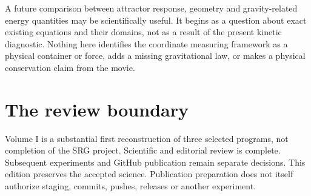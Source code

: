 A future comparison between attractor response, geometry and
gravity-related energy quantities may be scientifically useful.
It begins as a question about exact existing equations and
their domains, not as a result of the present kinetic diagnostic.
Nothing here identifies the coordinate measuring framework as a
physical container or force, adds a missing gravitational law,
or makes a physical conservation claim from the movie.

\section{The review boundary}
Volume I is a substantial first reconstruction of three selected
programs, not completion of the SRG project. Scientific and
editorial review is complete. Subsequent experiments and
GitHub publication remain separate decisions. This edition
preserves the accepted science. Publication preparation does
not itself authorize staging, commits, pushes, releases or
another experiment. 
